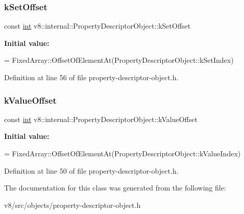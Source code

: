 \subsubsection{\texorpdfstring{k\+Set\+Offset}{kSetOffset}}
{\footnotesize\ttfamily const \mbox{\hyperlink{classint}{int}} v8\+::internal\+::\+Property\+Descriptor\+Object\+::k\+Set\+Offset\hspace{0.3cm}{\ttfamily [static]}}

{\bfseries Initial value\+:}
\begin{DoxyCode}
=
      FixedArray::OffsetOfElementAt(PropertyDescriptorObject::kSetIndex)
\end{DoxyCode}


Definition at line 56 of file property-\/descriptor-\/object.\+h.

\mbox{\label{classv8_1_1internal_1_1PropertyDescriptorObject_a000222a0b8a34079592182b2a9aa5d46}} 
\subsubsection{\texorpdfstring{k\+Value\+Offset}{kValueOffset}}
{\footnotesize\ttfamily const \mbox{\hyperlink{classint}{int}} v8\+::internal\+::\+Property\+Descriptor\+Object\+::k\+Value\+Offset\hspace{0.3cm}{\ttfamily [static]}}

{\bfseries Initial value\+:}
\begin{DoxyCode}
=
      FixedArray::OffsetOfElementAt(PropertyDescriptorObject::kValueIndex)
\end{DoxyCode}


Definition at line 50 of file property-\/descriptor-\/object.\+h.



The documentation for this class was generated from the following file\+:\begin{DoxyCompactItemize}
\item 
v8/src/objects/property-\/descriptor-\/object.\+h\end{DoxyCompactItemize}
